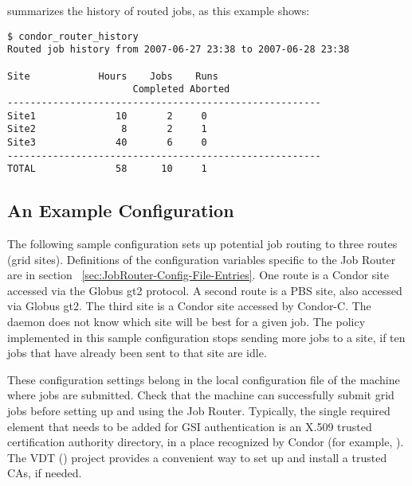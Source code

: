  summarizes the history of routed jobs,
as this example shows:

\begin{verbatim}
$ condor_router_history
Routed job history from 2007-06-27 23:38 to 2007-06-28 23:38

Site            Hours    Jobs    Runs
                      Completed Aborted
-------------------------------------------------------
Site1              10       2     0
Site2               8       2     1
Site3              40       6     0
-------------------------------------------------------
TOTAL              58      10     1
\end{verbatim}


\subsection{\label{ExampleJobRouterConfiguration} An Example Configuration}

The following sample configuration sets up potential job routing
to three routes (grid sites).
Definitions of the configuration variables specific to the Job Router
are in section~ \ref{sec:JobRouter-Config-File-Entries}.
One route is a Condor site accessed via the Globus gt2 protocol.
A second route is a PBS site, also accessed via Globus gt2.
The third site is a Condor site accessed by Condor-C.
The  daemon
does not know which site will be best for a given job.
The policy implemented in this sample configuration 
stops sending more jobs to a site,
if ten jobs that have already been sent to that site are idle.

These configuration settings belong in the local configuration file
of the machine where jobs are submitted.
Check that the machine can successfully submit grid jobs
before setting up and using the Job Router.
Typically, the single required element that needs to be
added for GSI authentication
is an X.509 trusted certification authority directory,
in a place recognized by Condor
(for example,  ).
The VDT () project provides 
a convenient way to set up and install a trusted CAs,
if needed.

